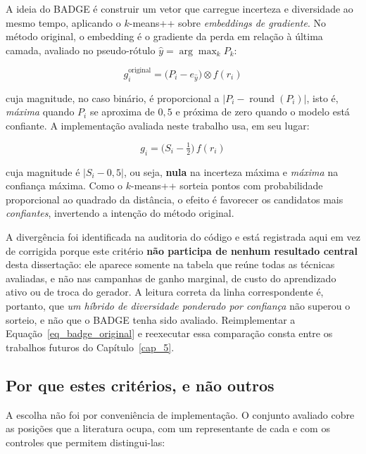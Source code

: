 A ideia do \ac{BADGE} é construir um vetor que carregue incerteza e diversidade ao mesmo tempo, aplicando o $k$-means++ sobre \emph{embeddings de gradiente}. No método original, o embedding é o gradiente da perda em relação à última camada, avaliado no pseudo-rótulo $\hat{y} = \arg\max_k P_k$:

\begin{equation}
g_i^{\text{original}} = \big(P_i - e_{\hat{y}}\big) \otimes f(r_i)
\label{eq_badge_original}
\end{equation}

cuja magnitude, no caso binário, é proporcional a $|P_i - \operatorname{round}(P_i)|$, isto é, \emph{máxima} quando $P_i$ se aproxima de $0{,}5$ e próxima de zero quando o modelo está confiante. A implementação avaliada neste trabalho usa, em seu lugar:

\begin{equation}
g_i = \big(S_i - \tfrac{1}{2}\big)\, f(r_i)
\label{eq_badge}
\end{equation}

cuja magnitude é $|S_i - 0{,}5|$, ou seja, \textbf{nula} na incerteza máxima e \emph{máxima} na confiança máxima. Como o $k$-means++ sorteia pontos com probabilidade proporcional ao quadrado da distância, o efeito é favorecer os candidatos mais \emph{confiantes}, invertendo a intenção do método original.

A divergência foi identificada na auditoria do código e está registrada aqui em vez de corrigida porque este critério \textbf{não participa de nenhum resultado central} desta dissertação: ele aparece somente na tabela que reúne todas as técnicas avaliadas, e não nas campanhas de ganho marginal, de custo do aprendizado ativo ou de troca do gerador. A leitura correta da linha correspondente é, portanto, que \emph{um híbrido de diversidade ponderado por confiança} não superou o sorteio, e não que o \ac{BADGE} tenha sido avaliado. Reimplementar a Equação~\ref{eq_badge_original} e reexecutar essa comparação consta entre os trabalhos futuros do Capítulo~\ref{cap_5}.

\subsection{Por que estes critérios, e não outros}

A escolha não foi por conveniência de implementação. O conjunto avaliado cobre as posições que a literatura ocupa, com um representante de cada e com os controles que permitem distingui-las:

